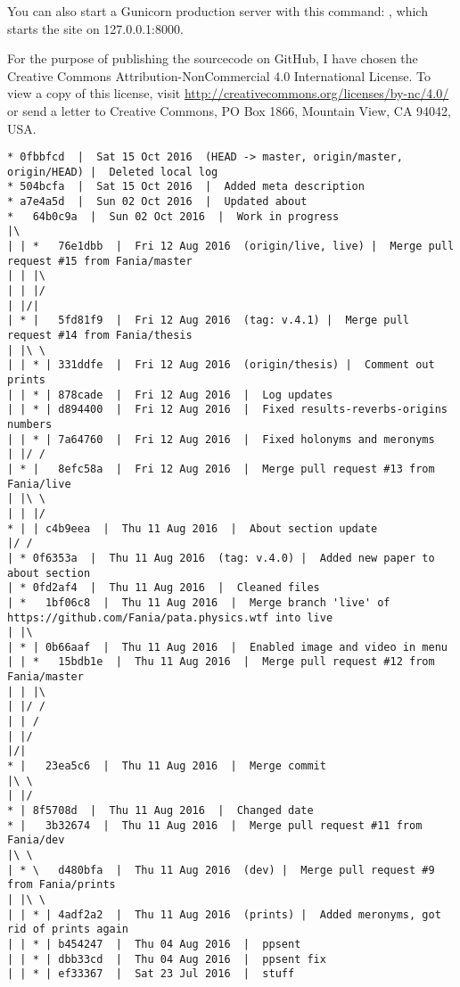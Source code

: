 You can also start a Gunicorn production server with this command: , which starts the site on 127.0.0.1:8000.

\spirals

For the purpose of publishing the sourcecode on GitHub, I have chosen the Creative Commons Attribution-NonCommercial 4.0 International License. To view a copy of this license, visit \url{http://creativecommons.org/licenses/by-nc/4.0/} or send a letter to Creative Commons, PO Box 1866, Mountain View, CA 94042, USA.

\spirals

\begin{verbatim}
* 0fbbfcd  |  Sat 15 Oct 2016  (HEAD -> master, origin/master, origin/HEAD) |  Deleted local log
* 504bcfa  |  Sat 15 Oct 2016  |  Added meta description
* a7e4a5d  |  Sun 02 Oct 2016  |  Updated about
*   64b0c9a  |  Sun 02 Oct 2016  |  Work in progress
|\  
| | *   76e1dbb  |  Fri 12 Aug 2016  (origin/live, live) |  Merge pull request #15 from Fania/master
| | |\  
| | |/  
| |/|   
| * |   5fd81f9  |  Fri 12 Aug 2016  (tag: v.4.1) |  Merge pull request #14 from Fania/thesis
| |\ \  
| | * | 331ddfe  |  Fri 12 Aug 2016  (origin/thesis) |  Comment out prints
| | * | 878cade  |  Fri 12 Aug 2016  |  Log updates
| | * | d894400  |  Fri 12 Aug 2016  |  Fixed results-reverbs-origins numbers
| | * | 7a64760  |  Fri 12 Aug 2016  |  Fixed holonyms and meronyms
| |/ /  
| * |   8efc58a  |  Fri 12 Aug 2016  |  Merge pull request #13 from Fania/live
| |\ \  
| | |/  
* | | c4b9eea  |  Thu 11 Aug 2016  |  About section update
|/ /  
| * 0f6353a  |  Thu 11 Aug 2016  (tag: v.4.0) |  Added new paper to about section
| * 0fd2af4  |  Thu 11 Aug 2016  |  Cleaned files
| *   1bf06c8  |  Thu 11 Aug 2016  |  Merge branch 'live' of https://github.com/Fania/pata.physics.wtf into live
| |\  
| * | 0b66aaf  |  Thu 11 Aug 2016  |  Enabled image and video in menu
| | *   15bdb1e  |  Thu 11 Aug 2016  |  Merge pull request #12 from Fania/master
| | |\  
| |/ /  
| | /   
| |/    
|/|     
* |   23ea5c6  |  Thu 11 Aug 2016  |  Merge commit
|\ \  
| |/  
* | 8f5708d  |  Thu 11 Aug 2016  |  Changed date
* |   3b32674  |  Thu 11 Aug 2016  |  Merge pull request #11 from Fania/dev
|\ \  
| * \   d480bfa  |  Thu 11 Aug 2016  (dev) |  Merge pull request #9 from Fania/prints
| |\ \  
| | * | 4adf2a2  |  Thu 11 Aug 2016  (prints) |  Added meronyms, got rid of prints again
| | * | b454247  |  Thu 04 Aug 2016  |  ppsent
| | * | dbb33cd  |  Thu 04 Aug 2016  |  ppsent fix
| | * | ef33367  |  Sat 23 Jul 2016  |  stuff

\end{verbatim}
